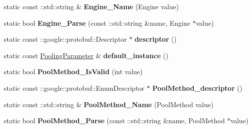 \begin{DoxyCompactItemize}
\item 
\mbox{\label{classcaffe_1_1_pooling_parameter_a30f62ffa47acc11e171cf1c7d4b7bf85}} 
static const \+::std\+::string \& {\bfseries Engine\+\_\+\+Name} (Engine value)
\item 
\mbox{\label{classcaffe_1_1_pooling_parameter_ada6d6e201eb0220667ba80ba5790f8be}} 
static bool {\bfseries Engine\+\_\+\+Parse} (const \+::std\+::string \&name, Engine $\ast$value)
\item 
\mbox{\label{classcaffe_1_1_pooling_parameter_a78d7362492923bb8e71359d48c4fd41e}} 
static const \+::google\+::protobuf\+::\+Descriptor $\ast$ {\bfseries descriptor} ()
\item 
\mbox{\label{classcaffe_1_1_pooling_parameter_acc11a86515ea49f30ad940b5ad31a1f4}} 
static const \mbox{\hyperlink{classcaffe_1_1_pooling_parameter}{Pooling\+Parameter}} \& {\bfseries default\+\_\+instance} ()
\item 
\mbox{\label{classcaffe_1_1_pooling_parameter_ac9fc26961c16edc011b65bed9cb921d9}} 
static bool {\bfseries Pool\+Method\+\_\+\+Is\+Valid} (int value)
\item 
\mbox{\label{classcaffe_1_1_pooling_parameter_a4d15c3a7b87c7bb2a1b03d03d3a1169e}} 
static const \+::google\+::protobuf\+::\+Enum\+Descriptor $\ast$ {\bfseries Pool\+Method\+\_\+descriptor} ()
\item 
\mbox{\label{classcaffe_1_1_pooling_parameter_a5c43aeb29c00aba1da53d33a630007cd}} 
static const \+::std\+::string \& {\bfseries Pool\+Method\+\_\+\+Name} (Pool\+Method value)
\item 
\mbox{\label{classcaffe_1_1_pooling_parameter_a8ca05290753c02903fb7f7b0187627c5}} 
static bool {\bfseries Pool\+Method\+\_\+\+Parse} (const \+::std\+::string \&name, Pool\+Method $\ast$value)
\item 
\mbox{\label{classcaffe_1_1_pooling_parameter_acac2202952bc2f044f3d1cbcef10f043}} 

\end{DoxyCompactItemize}
